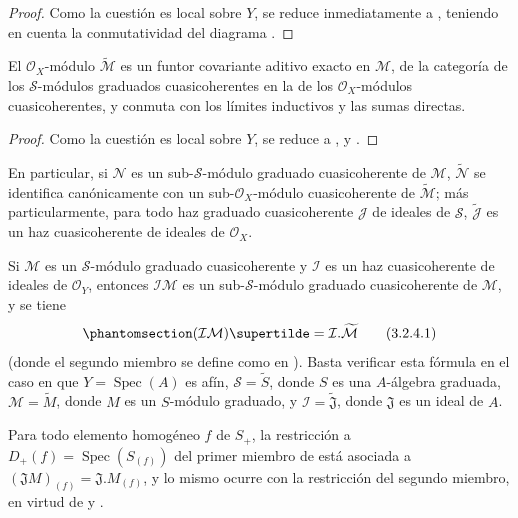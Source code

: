 \documentclass[oneside,10pt]{amsart}
\newcommand{\oldpage}[2][]{\marginnote{\normalfont\footnotesize\textbf{#1}~|~#2}\ignorespaces}
\let\EGAOriginalLabel\label
\renewcommand{\label}[1]{\phantomsection\EGAOriginalLabel{#1}}
\begin{document}
\begin{proof}
Como la cuestión es local sobre $Y$, se reduce inmediatamente a , teniendo en cuenta la conmutatividad del diagrama .
\end{proof}

\begin{proposition}[3.2.4]
\label{II.3.2.4-fr}
El $\mathcal{O}_X$-módulo $\widetilde{\mathcal{M}}$ es un funtor covariante aditivo exacto en $\mathcal{M}$, de la categoría de los $\mathcal{S}$-módulos graduados cuasicoherentes en la de los $\mathcal{O}_X$-módulos cuasicoherentes, y conmuta con los límites inductivos y las sumas directas.
\end{proposition}

\begin{proof}
Como la cuestión es local sobre $Y$, se reduce a ,  y .
\end{proof}

En particular, si $\mathcal{N}$ es un sub-$\mathcal{S}$-módulo graduado cuasicoherente de $\mathcal{M}$, $\widetilde{\mathcal{N}}$ se identifica canónicamente con un sub-$\mathcal{O}_X$-módulo cuasicoherente de $\widetilde{\mathcal{M}}$; más particularmente, para todo haz graduado cuasicoherente $\mathcal{J}$ de ideales de $\mathcal{S}$, $\widetilde{\mathcal{J}}$ es un haz cuasicoherente de ideales de $\mathcal{O}_X$.

Si $\mathcal{M}$ es un $\mathcal{S}$-módulo graduado cuasicoherente y $\mathcal{I}$ es un haz cuasicoherente de ideales de $\mathcal{O}_Y$, entonces $\mathcal{I}\mathcal{M}$ es un sub-$\mathcal{S}$-módulo graduado cuasicoherente de $\mathcal{M}$, y se tiene
\[
\label{II.3.2.4.1-fr}
  (\mathcal{I}\mathcal{M})\supertilde
  =\mathcal{I}.\widetilde{\mathcal{M}}
\tag{3.2.4.1}
\]
(donde el segundo miembro se define como en ).
Basta verificar esta fórmula en el caso en que $Y=\operatorname{Spec}(A)$ es afín, $\mathcal{S}=\widetilde{S}$, donde $S$ es una $A$-álgebra graduada, $\mathcal{M}=\widetilde{M}$, 
\oldpage[II]{55}
donde $M$ es un $S$-módulo graduado, y $\mathcal{I}=\widetilde{\mathfrak{J}}$, donde $\mathfrak{J}$ es un ideal de $A$.

Para todo elemento homogéneo $f$ de $S_+$, la restricción a $D_+(f)=\operatorname{Spec}(S_{(f)})$ del primer miembro de  está asociada a $(\mathfrak{J}M)_{(f)}=\mathfrak{J}.M_{(f)}$, y lo mismo ocurre con la restricción del segundo miembro, en virtud de  y .
\end{document}
